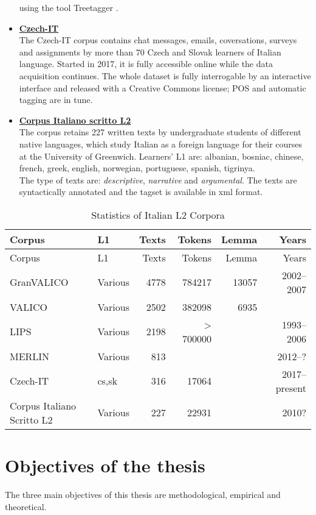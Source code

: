 \documentclass[a4paper,twoside,12pt,chapterprefix=false,bibliography=totocnumbered,listof=flat]{scrbook}
\theoremstyle{definition}
\theoremstyle{definition}
\theoremstyle{definition}
\theoremstyle{remark}
\begin{document}
\begin{itemize}
  using the tool Treetagger \citep{schmid1994}.
\item
  \textbf{\href{http://czech-it.github.io}{Czech-IT}} \citep{czech-it}\\
  The Czech-IT corpus contains chat messages, emails, coversations,
  surveys and assignments by more than 70 Czech and Slovak learners of
  Italian language. Started in 2017, it is fully accessible online while
  the data acquisition continues. The whole dataset is fully
  interrogable by an interactive interface and released with a Creative
  Commons license; POS and automatic tagging are in tune.
\item
  \textbf{\href{http://www.parlaritaliano.it/index.php/it/corpora-di-parlato/662-corpus-italiano-scritto-l2}{Corpus
  Italiano scritto L2}} \citep{vogheraturco2010}\\
  The corpus retains 227 written texts by undergraduate students of
  different native languages, which study Italian as a foreign language
  for their courses at the University of Greenwich. Learners' L1 are:
  albanian, bosniac, chinese, french, greek, english, norwegian,
  portuguese, spanish, tigrinya.\\
  The type of texts are: \emph{descriptive}, \emph{narrative} and
  \emph{argumental}. The texts are syntactically annotated and the
  tagset is available in xml format.
\end{itemize}

\begin{longtable}[]{@{}llrrrr@{}}
\caption{Statistics of Italian L2 Corpora}\tabularnewline
\toprule
Corpus & L1 & Texts & Tokens & Lemma & Years\tabularnewline
\midrule
\endfirsthead
\toprule
Corpus & L1 & Texts & Tokens & Lemma & Years\tabularnewline
\midrule
\endhead
GranVALICO & Various & 4778 & 784217 & 13057 & 2002--2007\tabularnewline
VALICO & Various & 2502 & 382098 & 6935 &\tabularnewline
LIPS & Various & 2198 & \textgreater{} 700000 & &
1993--2006\tabularnewline
MERLIN & Various & 813 & & & 2012--?\tabularnewline
Czech-IT & cs,sk & 316 & 17064 & & 2017--present\tabularnewline
Corpus Italiano Scritto L2 & Various & 227 & 22931 & &
2010?\tabularnewline
\bottomrule
\end{longtable}

\section{Objectives of the thesis}\label{objectives-of-the-thesis}

The three main objectives of this thesis are methodological, empirical
and theoretical.
\end{document}
